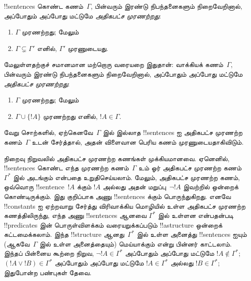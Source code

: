 \documentclass[../../../include/open-logic-section]{subfiles}
\begin{document}

\begin{defn}
!!{sentence}s கொண்ட கணம்~$\Gamma$, பின்வரும் இரண்டு நிபந்தனைகளும்
நிறைவேறினால், அப்போதும் அப்போது மட்டுமே \emph{அதிகபட்ச முரணற்றது}:
\begin{enumerate}
\item $\Gamma$ முரணற்றது; மேலும்
\item $\Gamma \subsetneq \Gamma'$ எனில், $\Gamma'$ முரணுடையது.
\end{enumerate}
\end{defn}

\begin{explain}
மேலுள்ளதற்குச் சமானமான மற்றொரு வரையறை இதுதான்: வாக்கியக்
கணம்~$\Gamma$, பின்வரும் இரண்டு நிபந்தனைகளும் நிறைவேறினால்,
அப்போதும் அப்போது மட்டுமே \emph{அதிகபட்ச முரணற்றது}:
\begin{enumerate}
\item $\Gamma$ முரணற்றது; மேலும்
\item $\Gamma \cup \{ !A \}$ முரணற்றது எனில், $!A \in \Gamma$.
\end{enumerate}
வேறு சொற்களில், ஏற்கெனவே~$\Gamma$ இல் இல்லாத !!{sentence}s ஐ
அதிகபட்ச முரணற்ற கணம்~$\Gamma$ உடன் சேர்த்தால், அதன் விளைவான பெரிய கணம்
முரணுடையதாகிவிடும்.
\end{explain}

\begin{explain}
நிறைவு நிறுவலில் அதிகபட்ச முரணற்ற கணங்கள் முக்கியமானவை. ஏனெனில்,
!!{sentence}s கொண்ட எந்த முரணற்ற கணம்~$\Gamma$ உம் ஓர் அதிகபட்ச
முரணற்ற கணம்~$\Gamma^*$ இல் அடங்கும் என்பதை உறுதிசெய்யலாம். மேலும்,
அதிகபட்ச முரணற்ற கணம், ஒவ்வொரு !!{sentence}~$!A$ க்கும் $!A$
அல்லது அதன் மறுப்பு~$\lnot !A$ இவற்றில் ஒன்றைக் கொண்டிருக்கும்.
இது குறிப்பாக அணு !!{sentence}s க்கும் பொருந்துகிறது. எனவே
!!{constant}s ஐ ஏற்றவாறு சேர்த்து விரிவாக்கிய மொழியில் உள்ள
அதிகபட்ச முரணற்ற கணத்திலிருந்து, எந்த அணு !!{sentence}s ஆனவை
$\Gamma^*$ இல் உள்ளன என்பதன்படி !!{predicate}s இன் பொருள்விளக்கம்
வரையறுக்கப்படும் !!a{structure} ஒன்றைக் கட்டமைக்கலாம். இந்த
!!{structure} ஆனது~$\Gamma^*$ இல் உள்ள அனைத்து !!{sentence}s ஐயும்
(ஆகவே~$\Gamma$ இல் உள்ள அனைத்தையும்) மெய்யாக்கும் என்று பின்னர்
காட்டலாம். இந்தப் பின்னைய கூற்றை நிறுவ, $\lnot !A \in
\Gamma^*$ அப்போதும் அப்போது மட்டுமே $!A \notin \Gamma^*$;
$(!A \lor !B) \in \Gamma^*$ அப்போதும் அப்போது மட்டுமே $!A
\in \Gamma^*$ அல்லது $!B \in \Gamma^*$; இதுபோன்ற பண்புகள் தேவை.
\end{explain}
\end{document}
